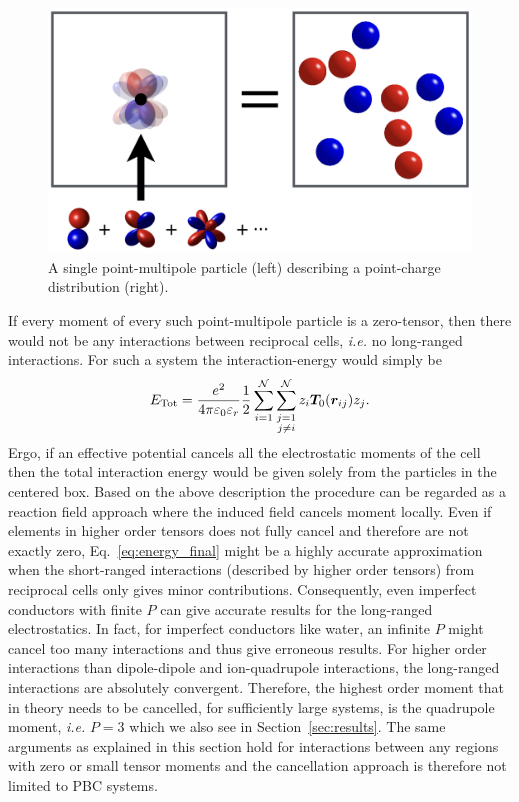 \documentclass[
journal=jctcce,
manuscript=letter]{achemso}
\begin{document}
\begin{figure}[!ht]
\centering
   \includegraphics[width=0.5\columnwidth]{multipole-fig.png}
\caption{A single point-multipole particle (left) describing a point-charge distribution (right).}
\label{fig:box_conv} 
\end{figure}
If every moment of every such point-multipole particle is a zero-tensor, then there would not be any interactions between reciprocal cells, \emph{i.e.} no long-ranged interactions. For such a system the interaction-energy would simply be
\begin{equation}
\label{eq:energy_final}
E_{\rm Tot} = \frac{e^2}{4\pi\varepsilon_0\varepsilon_r}\frac{1}{2}\sum_{i=1}^{\mathcal{N}}\sum_{\substack{j = 1 \\ j \ne i }}^{\mathcal{N}} z_i\boldsymbol{T}_0(\boldsymbol{r}_{ij}) z_j.
\end{equation}
Ergo, if an effective potential cancels all the electrostatic moments of the cell then the total interaction energy would be given solely from the particles in the centered box. Based on the above description the procedure can be regarded as a reaction field approach where the induced field cancels moment locally.
Even if elements in higher order tensors does not fully cancel and therefore are not exactly zero, Eq.~\ref{eq:energy_final} might be a highly accurate approximation when the short-ranged interactions (described by higher order tensors) from reciprocal cells only gives minor contributions. Consequently, even imperfect conductors with finite $P$ can give accurate results for the long-ranged electrostatics. In fact, for imperfect conductors like water, an infinite $P$ might cancel too many interactions and thus give erroneous results. For higher order interactions than dipole-dipole and ion-quadrupole interactions, the long-ranged interactions are absolutely convergent. Therefore, the highest order moment that in theory needs to be cancelled, for sufficiently large systems, is the quadrupole moment, \emph{i.e.} $P=3$ which we also see in Section~\ref{sec:results}. The same arguments as explained in this section hold for interactions between any regions with zero or small tensor moments and the cancellation approach is therefore not limited to PBC systems.
\end{document}
